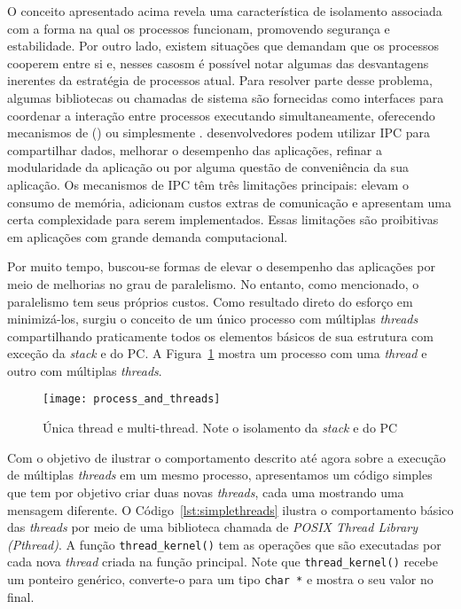 O conceito apresentado acima revela uma característica de isolamento associada
com a forma na qual os processos funcionam, promovendo segurança e estabilidade.
Por outro
lado, existem situações que demandam que os processos cooperem entre si e,
nesses casosm é possível notar algumas das desvantagens inerentes da estratégia
de processos atual. Para resolver parte desse problema, algumas bibliotecas ou
chamadas de sistema são fornecidas como interfaces para coordenar a
interação entre processos executando simultaneamente, oferecendo mecanismos
de  () ou simplesmente .  desenvolvedores podem utilizar IPC para
compartilhar dados, melhorar o desempenho das aplicações, refinar a
modularidade da aplicação ou por alguma questão de conveniência da sua
aplicação. Os mecanismos de IPC têm três limitações principais: elevam o consumo de memória,
adicionam custos extras de comunicação e apresentam uma certa complexidade para
serem implementados. Essas limitações são proibitivas em aplicações com grande
demanda computacional.

Por muito tempo, buscou-se formas de elevar o desempenho das
aplicações por meio de melhorias no grau de paralelismo. No entanto, como
mencionado, o paralelismo tem seus próprios custos. Como resultado direto
do esforço em minimizá-los,
surgiu o conceito de um único processo com múltiplas \emph{threads}
compartilhando praticamente todos os elementos básicos de sua estrutura com exceção da
\emph{stack} e do PC. A Figura~\ref{fig:single_thread_multi_thread} mostra um
processo com uma \emph{thread} e outro com múltiplas \emph{threads}.

\begin{figure}[!h]
  \centering
  \texttt{[image: process\_and\_threads]}
  \caption{Única thread e multi-thread. Note o isolamento da \emph{stack} e do PC~\citep{silberschatz}}
  \label{fig:single_thread_multi_thread}
\end{figure}

Com o objetivo de ilustrar o comportamento descrito até agora sobre a execução
de múltiplas \emph{threads} em um mesmo processo, apresentamos um código
simples que tem por objetivo criar duas novas \emph{threads}, cada uma mostrando
uma mensagem diferente. O Código~\ref{lst:simplethreads} ilustra o
comportamento básico das \emph{threads} por meio de uma biblioteca chamada de
\emph{POSIX Thread Library (Pthread)}. A função
\texttt{thread\_kernel()} tem as operações que são executadas por cada nova
\emph{thread} criada na função principal. Note que \texttt{thread\_kernel()}
recebe um ponteiro genérico, converte-o para um tipo \texttt{char *} e
mostra o seu valor no final.

